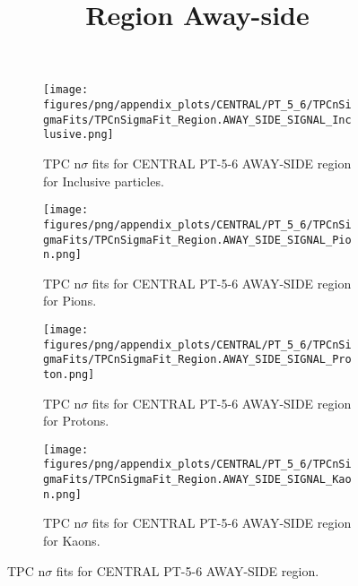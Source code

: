             \begin{figure}[H]
                \title{Region Away-side}
                \begin{subfigure}[b]{0.5\textwidth}
                    \centering
                    \texttt{[image: figures/png/appendix\_plots/CENTRAL/PT\_5\_6/TPCnSigmaFits/TPCnSigmaFit\_Region.AWAY\_SIDE\_SIGNAL\_Inclusive.png]}
                    \caption{TPC n$\sigma$ fits for CENTRAL PT-5-6 AWAY-SIDE region for Inclusive particles.}
                    \label{fig:appendix_CENTRAL_PT-5-6_AWAY_SIDE_SIGNAL_Inclusive}
                \end{subfigure}
                \begin{subfigure}[b]{0.5\textwidth}
                    \centering
                    \texttt{[image: figures/png/appendix\_plots/CENTRAL/PT\_5\_6/TPCnSigmaFits/TPCnSigmaFit\_Region.AWAY\_SIDE\_SIGNAL\_Pion.png]}
                    \caption{TPC n$\sigma$ fits for CENTRAL PT-5-6 AWAY-SIDE region for Pions.}
                    \label{fig:appendix_CENTRAL_PT-5-6_AWAY_SIDE_SIGNAL_Pion}
                \end{subfigure}
                \begin{subfigure}[b]{0.5\textwidth}
                    \centering
                    \texttt{[image: figures/png/appendix\_plots/CENTRAL/PT\_5\_6/TPCnSigmaFits/TPCnSigmaFit\_Region.AWAY\_SIDE\_SIGNAL\_Proton.png]}
                    \caption{TPC n$\sigma$ fits for CENTRAL PT-5-6 AWAY-SIDE region for Protons.}
                    \label{fig:appendix_CENTRAL_PT-5-6_AWAY_SIDE_SIGNAL_Proton}
                \end{subfigure}
                \begin{subfigure}[b]{0.5\textwidth}
                    \centering
                    \texttt{[image: figures/png/appendix\_plots/CENTRAL/PT\_5\_6/TPCnSigmaFits/TPCnSigmaFit\_Region.AWAY\_SIDE\_SIGNAL\_Kaon.png]}
                    \caption{TPC n$\sigma$ fits for CENTRAL PT-5-6 AWAY-SIDE region for Kaons.}
                    \label{fig:appendix_CENTRAL_PT-5-6_AWAY_SIDE_SIGNAL_Kaon}
                \end{subfigure}
                \caption{TPC n$\sigma$ fits for CENTRAL PT-5-6 AWAY-SIDE region.}
                \label{fig:appendix_CENTRAL_PT-5-6_AWAY_SIDE_SIGNAL}
            \end{figure}
